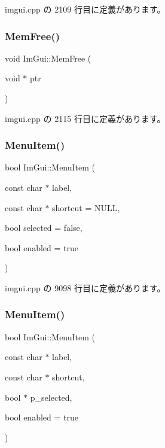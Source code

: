 imgui.\+cpp の 2109 行目に定義があります。

\mbox{\label{namespace_im_gui_a269ec695c6e722ec3da85dae37f0675d}} 
\subsubsection{\texorpdfstring{Mem\+Free()}{MemFree()}}
{\footnotesize\ttfamily void Im\+Gui\+::\+Mem\+Free (\begin{DoxyParamCaption}\item[{void $\ast$}]{ptr }\end{DoxyParamCaption})}



 imgui.\+cpp の 2115 行目に定義があります。

\mbox{\label{namespace_im_gui_aa1bae511ca47478998693a9d8c84f2e6}} 
\subsubsection{\texorpdfstring{Menu\+Item()}{MenuItem()}\hspace{0.1cm}{\footnotesize\ttfamily [1/2]}}
{\footnotesize\ttfamily bool Im\+Gui\+::\+Menu\+Item (\begin{DoxyParamCaption}\item[{const char $\ast$}]{label,  }\item[{const char $\ast$}]{shortcut = {\ttfamily NULL},  }\item[{bool}]{selected = {\ttfamily false},  }\item[{bool}]{enabled = {\ttfamily true} }\end{DoxyParamCaption})}



 imgui.\+cpp の 9098 行目に定義があります。

\mbox{\label{namespace_im_gui_a237e76bff3088f1c2622f4aebae2356e}} 
\subsubsection{\texorpdfstring{Menu\+Item()}{MenuItem()}\hspace{0.1cm}{\footnotesize\ttfamily [2/2]}}
{\footnotesize\ttfamily bool Im\+Gui\+::\+Menu\+Item (\begin{DoxyParamCaption}\item[{const char $\ast$}]{label,  }\item[{const char $\ast$}]{shortcut,  }\item[{bool $\ast$}]{p\+\_\+selected,  }\item[{bool}]{enabled = {\ttfamily true} }\end{DoxyParamCaption})}



